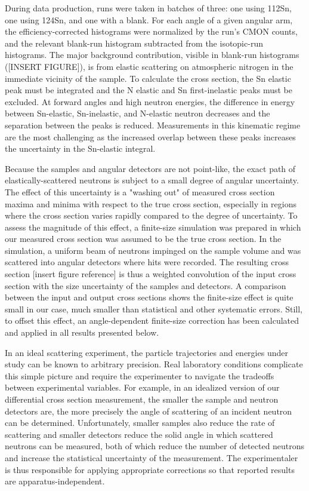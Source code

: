 During data production, runs were taken in batches of three: one using 112Sn,
one using 124Sn, and one with a blank. For each angle of a given angular arm, the
efficiency-corrected histograms were normalized by the run's CMON counts,
and the relevant blank-run histogram subtracted from the isotopic-run
histograms. The major background contribution, visible in blank-run histograms
([INSERT FIGURE]), is from elastic scattering on atmospheric nitrogen
in the immediate vicinity of the sample. To calculate the cross section, the
Sn elastic peak must be integrated and the N elastic and Sn first-inelastic
peaks must be excluded. At forward angles and high neutron energies, the
difference in energy between Sn-elastic, Sn-inelastic, and N-elastic neutron
decreases and the separation between the peaks is reduced. Measurements in this
kinematic regime are the most challenging as the increased overlap between
these peaks increases the uncertainty in the Sn-elastic integral.

Because the samples and angular detectors are not point-like, the exact
path of elastically-scattered neutrons is subject to a small degree of angular
uncertainty. The effect of this uncertainty is a "washing out" of measured cross
section maxima and minima with respect to the true cross section, especially in
regions where the cross section varies rapidly compared to the degree of
uncertainty. To assess the magnitude of this effect, a finite-size
simulation was prepared in which our measured cross section was assumed
to be the true cross section. In the simulation, a uniform beam of neutrons
impinged on the sample volume and was scattered into angular detectors where
hits were recorded. The resulting cross section [insert figure reference] is
thus a weighted convolution of the input cross section with the size uncertainty
of the samples and detectors. A comparison between the input and output cross
sections shows the finite-size effect is quite small in our case, much smaller
than statistical and other systematic errors. Still, to offset this effect, an
angle-dependent finite-size correction has been calculated and applied in all
results presented below.

In an ideal scattering experiment, the particle trajectories
and energies under study can be known to arbitrary precision. Real laboratory
conditions complicate this simple picture and require the experimenter to
navigate the tradeoffs between experimental variables. For example, in an
idealized version of our differential cross
section measurement, the smaller the sample and neutron detectors are, the more precisely
the angle of scattering of an incident neutron can be determined. Unfortunately,
smaller samples also reduce the rate of scattering and smaller detectors
reduce the solid angle in which scattered neutrons can be measured, both of
which reduce the number of detected neutrons and increase the statistical
uncertainty of the measurement. The experimentaler is thus responsible for applying
appropriate corrections so that reported results are apparatus-independent.

